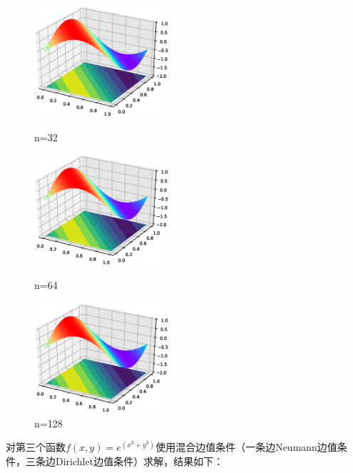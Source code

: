 \documentclass[12]{article}%
\begin{document}
\begin{figure}[H]
    \centering
    \begin{minipage}[t]{0.3\textwidth}
    \centering
    \includegraphics[width=5cm]{../pic/fun232.eps}
    \caption{n=32}
    \end{minipage}
    \begin{minipage}[t]{0.3\textwidth}
    \centering
    \includegraphics[width=5cm]{../pic/fun264.eps}
    \caption{n=64}
    \end{minipage}
    \begin{minipage}[t]{0.3\textwidth}
    \centering
    \includegraphics[width=5cm]{../pic/fun2128.eps}
    \caption{n=128}
    \end{minipage}
\end{figure}
对第三个函数$f(x,y)=e^(x^3+y^3)$使用混合边值条件（一条边Neumann边值条件，三条边Dirichlet边值条件）求解，结果如下：
\end{document}
